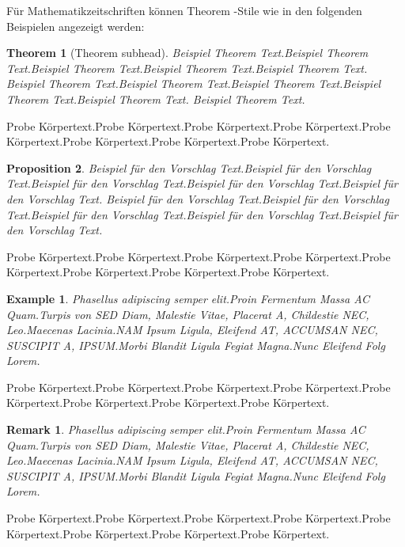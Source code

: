 \documentclass[pdflatex,sn-mathphys-num]{sn-jnl}%
\theoremstyle{thmstyleone}%
\newtheorem{theorem}{Theorem}%
\newtheorem{proposition}[theorem]{Proposition}%
\theoremstyle{thmstyletwo}%
\newtheorem{example}{Example}%
\newtheorem{remark}{Remark}%
\theoremstyle{thmstylethree}%
\begin{document}
Für Mathematikzeitschriften können Theorem -Stile wie in den folgenden Beispielen angezeigt werden:

\begin{theorem}[Theorem subhead] \label{thm1}
Beispiel Theorem Text.Beispiel Theorem Text.Beispiel Theorem Text.Beispiel Theorem Text.Beispiel Theorem Text.
Beispiel Theorem Text.Beispiel Theorem Text.Beispiel Theorem Text.Beispiel Theorem Text.Beispiel Theorem Text.
Beispiel Theorem Text.
\end{theorem}

Probe Körpertext.Probe Körpertext.Probe Körpertext.Probe Körpertext.Probe Körpertext.Probe Körpertext.Probe Körpertext.Probe Körpertext.

\begin{proposition}
Beispiel für den Vorschlag Text.Beispiel für den Vorschlag Text.Beispiel für den Vorschlag Text.Beispiel für den Vorschlag Text.Beispiel für den Vorschlag Text.
Beispiel für den Vorschlag Text.Beispiel für den Vorschlag Text.Beispiel für den Vorschlag Text.Beispiel für den Vorschlag Text.Beispiel für den Vorschlag Text.
\end{proposition}

Probe Körpertext.Probe Körpertext.Probe Körpertext.Probe Körpertext.Probe Körpertext.Probe Körpertext.Probe Körpertext.Probe Körpertext.

\begin{example}
Phasellus adipiscing semper elit.Proin Fermentum Massa
AC Quam.Turpis von SED Diam, Malestie Vitae, Placerat A, Childestie NEC, Leo.Maecenas Lacinia.NAM Ipsum Ligula, Eleifend
AT, ACCUMSAN NEC, SUSCIPIT A, IPSUM.Morbi Blandit Ligula Fegiat Magna.Nunc Eleifend Folg Lorem.
\end{example}

Probe Körpertext.Probe Körpertext.Probe Körpertext.Probe Körpertext.Probe Körpertext.Probe Körpertext.Probe Körpertext.Probe Körpertext.

\begin{remark}
Phasellus adipiscing semper elit.Proin Fermentum Massa
AC Quam.Turpis von SED Diam, Malestie Vitae, Placerat A, Childestie NEC, Leo.Maecenas Lacinia.NAM Ipsum Ligula, Eleifend
AT, ACCUMSAN NEC, SUSCIPIT A, IPSUM.Morbi Blandit Ligula Fegiat Magna.Nunc Eleifend Folg Lorem.
\end{remark}

Probe Körpertext.Probe Körpertext.Probe Körpertext.Probe Körpertext.Probe Körpertext.Probe Körpertext.Probe Körpertext.Probe Körpertext.
\end{document}
